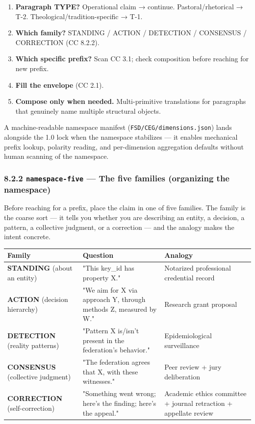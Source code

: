 \documentclass[11pt]{article}
\begin{document}
\begin{enumerate}\setlength\itemsep{0pt}
\item \textbf{Paragraph TYPE?} Operational claim → continue. Pastoral/rhetorical → T-2. Theological/tradition-specific → T-1.
\item \textbf{Which family?} STANDING / ACTION / DETECTION / CONSENSUS / CORRECTION (CC 8.2.2).
\item \textbf{Which specific prefix?} Scan CC 3.1; check composition before reaching for new prefix.
\item \textbf{Fill the envelope} (CC 2.1).
\item \textbf{Compose only when needed.} Multi-primitive translations for paragraphs that genuinely name multiple structural objects.
\end{enumerate}


A machine-readable namespace manifest (\texttt{FSD/CEG/dimensions.json}) lands alongside the 1.0 lock when the namespace stabilizes — it enables mechanical prefix lookup, polarity reading, and per-dimension aggregation defaults without human scanning of the namespace.


\subsubsection*{8.2.2 \texttt{namespace-five} — The five families (organizing the namespace)}


Before reaching for a prefix, place the claim in one of five families. The family is the coarse sort — it tells you whether you are describing an entity, a decision, a pattern, a collective judgment, or a correction — and the analogy makes the intent concrete.


{\footnotesize
\begin{longtable}{|p{5.33cm}|p{5.33cm}|p{5.33cm}|}\hline
\textbf{Family} & \textbf{Question} & \textbf{Analogy} \\ \hline\endhead
\textbf{STANDING} (about an entity) & "This key\_id has property X." & Notarized professional credential record \\ \hline
\textbf{ACTION} (decision hierarchy) & "We aim for X via approach Y, through methods Z, measured by W." & Research grant proposal \\ \hline
\textbf{DETECTION} (reality patterns) & "Pattern X is/isn't present in the federation's behavior." & Epidemiological surveillance \\ \hline
\textbf{CONSENSUS} (collective judgment) & "The federation agrees that X, with these witnesses." & Peer review + jury deliberation \\ \hline
\textbf{CORRECTION} (self-correction) & "Something went wrong; here's the finding; here's the appeal." & Academic ethics committee + journal retraction + appellate review \\ \hline
\end{longtable}}
\end{document}
